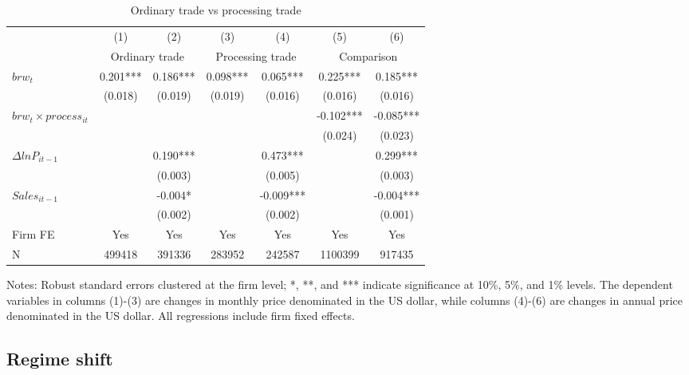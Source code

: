 \begin{table}[h]
    \centering
    \caption{Ordinary trade vs processing trade}
    \begin{threeparttable}
    \begin{tabular}{lcccccc}
        \toprule
        & (1)   & (2)   & (3)   & (4)   & (5)   & (6) \\
          & \multicolumn{2}{c}{Ordinary trade}  & \multicolumn{2}{c}{Processing trade} & \multicolumn{2}{c}{Comparison}\\
        \midrule
        $brw_t$   & 0.201*** & 0.186*** & 0.098*** & 0.065*** & 0.225*** & 0.185*** \\
              & (0.018) & (0.019) & (0.019) & (0.016) & (0.016) & (0.016) \\
        $brw_t \times process_{it}$ &       &       &       &       & -0.102*** & -0.085*** \\
              &       &       &       &       & (0.024) & (0.023) \\
        $\Delta ln P_{it-1}$ &       & 0.190*** &       & 0.473*** &       & 0.299*** \\
              &       & (0.003) &       & (0.005) &       & (0.003) \\
        $Sales_{it-1}$ &       & -0.004* &       & -0.009*** &       & -0.004*** \\
              &       & (0.002) &       & (0.002) &       & (0.001) \\
        Firm FE & Yes   & Yes   & Yes   & Yes   & Yes   & Yes \\
        N     & 499418 & 391336 & 283952 & 242587 & 1100399 & 917435 \\
        \bottomrule
    \end{tabular}
        \begin{tablenotes}
            \footnotesize
            \item Notes: Robust standard errors clustered at the firm level;  *, **, and *** indicate significance at 10\%, 5\%, and 1\% levels. The dependent variables in columns (1)-(3) are changes in monthly price denominated in the US dollar, while columns (4)-(6) are changes in annual price denominated in the US dollar. All regressions include firm fixed effects.
	\end{tablenotes}
    \end{threeparttable}
    \label{tab.process}
\end{table}

\subsection{Regime shift}

